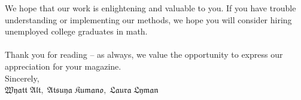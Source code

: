 \documentclass[12pt]{reedmcm}
\begin{document}
\indent We hope that our work is enlightening and valuable to you.  If you have trouble understanding or implementing our methods, we hope you will consider hiring unemployed college graduates in math.\\
\\
Thank you for reading -- as always, we value the opportunity to express our appreciation for your magazine.\\

Sincerely,\\
$\mathfrak{Wyatt\; Alt,\; Atsuya\; Kumano,\; Laura\; Lyman}$



\renewcommand{\bibname}{References}

\nocite{*}

\end{document}
